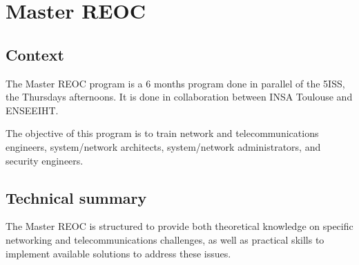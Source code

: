 \section{Master REOC}

\subsection{Context}
\indent \indent The Master REOC program is a 6 months program done in parallel of the 5ISS, the Thursdays afternoons. It is done in collaboration between INSA Toulouse and ENSEEIHT.
\vspace{0.25cm}

\noindent The objective of this program is to train network and telecommunications engineers, system/network architects, system/network administrators, and security engineers.

\subsection{Technical summary}

\indent \indent The Master REOC is structured to provide both theoretical knowledge on specific networking and telecommunications challenges, as well as practical skills to implement available solutions to address these issues.
\vspace{0.25cm}

